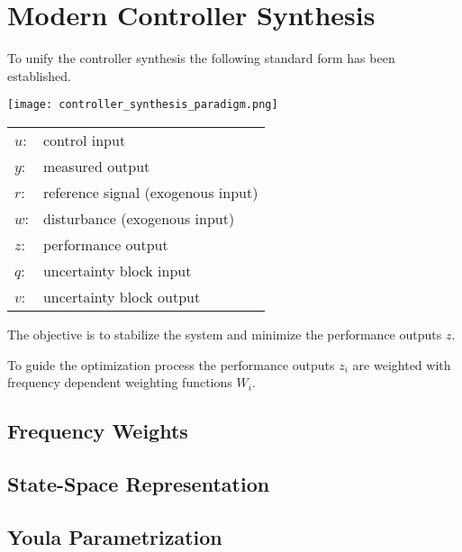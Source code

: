 \section{Modern Controller Synthesis}
To unify the controller synthesis the following standard form has been established.

\begin{center}
    \texttt{[image: controller\_synthesis\_paradigm.png]}
\end{center}

\begin{tabularx}{\linewidth}{@{}ll@{}}
    $u$: & control input                      \\
    $y$: & measured output                    \\
    $r$: & reference signal (exogenous input) \\
    $w$: & disturbance (exogenous input)      \\
    $z$: & performance output                 \\
    $q$: & uncertainty block input            \\
    $v$: & uncertainty block output
\end{tabularx}

The objective is to stabilize the system and minimize the performance outputs $z$.

To guide the optimization process the performance outputs $z_i$ are weighted with frequency dependent weighting functions $W_i$. 

\subsection{Frequency Weights}

\subsection{State-Space Representation}

\begin{examplesection}

\end{examplesection}

\subsection{Youla Parametrization}